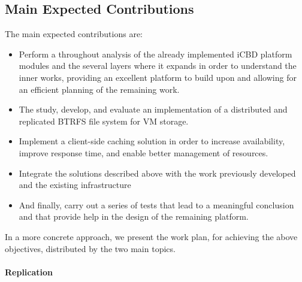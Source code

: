 


\subsection{Main Expected Contributions} %
\label{sub:intro_main_expected_contributions}

The main expected contributions are: 

\begin{itemize}
  \item Perform a throughout analysis of the already implemented iCBD platform modules and the several layers where it expands in order to understand the inner works, providing an excellent platform to build upon and allowing for an efficient planning of the remaining work. 
  \item The study, develop, and evaluate an implementation of a distributed and replicated BTRFS file system for VM storage.
  \item Implement a client-side caching solution in order to increase availability, improve response time, and enable better management of resources.
  \item Integrate the solutions described above  with the work previously developed and the existing infrastructure
  \item And finally, carry out a series of tests that lead to a meaningful conclusion and that provide help in the design of the remaining platform.
\end{itemize}


In a more concrete approach, we present the work plan, for achieving the above objectives, distributed by the two main topics.


\paragraph{Replication}
\label{par:intro_replication_goals}

